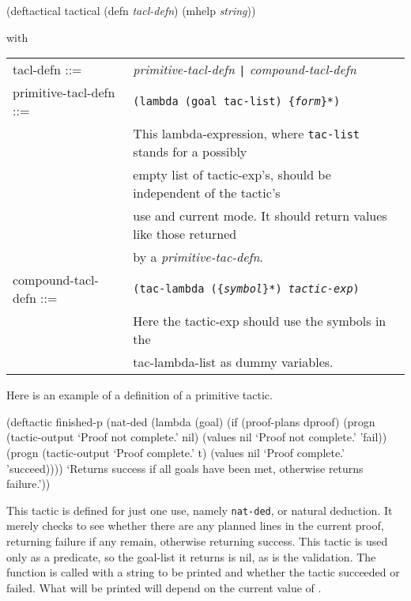 \begin{lispcode}
(deftactical tactical
  (defn {\it tacl-defn})
  (mhelp {\it string}))
\end{lispcode}


with

\begin{tabular}{ll}
tacl-defn ::= &  {\it primitive-tacl-defn}  {\tt |} {\it compound-tacl-defn}\\
primitive-tacl-defn ::= &  {\tt (lambda (goal tac-list) \{{\it form}\}*)}\\
 &  This lambda-expression, where {\tt tac-list} stands for a possibly\\
 &  empty list of tactic-exp's, should be independent of the tactic's\\
 &  use and current mode.  It should return values like those returned\\
 &  by a {\it primitive-tac-defn}.\\
compound-tacl-defn ::= &  {\tt (tac-lambda (\{{\it symbol}\}*) {\it tactic-exp})}\\
 &  Here the tactic-exp should use the symbols in the\\
 &  tac-lambda-list as dummy variables.\\
\end{tabular}

Here is an example of a definition of a primitive tactic.
\begin{lispcode}
(deftactic finished-p
 (nat-ded
  (lambda (goal)
    (if (proof-plans dproof)
	(progn
	 (tactic-output `Proof not complete.' nil)
	 (values nil `Proof not complete.' 'fail))
	(progn
	 (tactic-output `Proof complete.' t)
	 (values nil `Proof complete.' 'succeed))))
  `Returns success if all goals have been met, otherwise
returns failure.'))
\end{lispcode}

This tactic is defined for just one use, namely {\tt nat-ded}, or natural
deduction.  It merely checks to see whether there are any planned lines
in the current proof, returning failure if any remain, otherwise
returning success.  This tactic is used only as a predicate, so the
goal-list it returns is nil, as is the validation.  The function
 is called with a string to be printed and
whether the tactic succeeded or failed.  What will be printed will depend
on the current value of .

